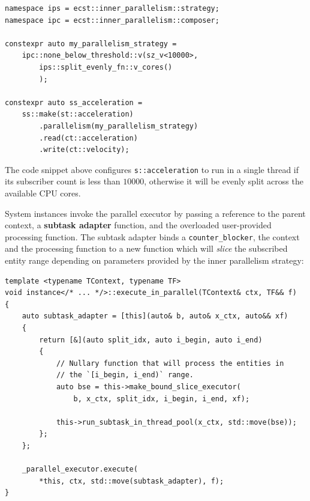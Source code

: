 \documentclass[twoside, 12pt, a4paper, openany]{book}
\begin{document}
\begin{verbatim}
namespace ips = ecst::inner_parallelism::strategy;
namespace ipc = ecst::inner_parallelism::composer;

constexpr auto my_parallelism_strategy =
    ipc::none_below_threshold::v(sz_v<10000>,
        ips::split_evenly_fn::v_cores()
        );

constexpr auto ss_acceleration =
    ss::make(st::acceleration)
        .parallelism(my_parallelism_strategy)
        .read(ct::acceleration)
        .write(ct::velocity);
\end{verbatim}

The code snippet above configures
\texttt{s::acceleration}
to run in a single thread if its subscriber count is less than
\(10000\), otherwise it will be evenly split across the available CPU
cores.

System instances invoke the parallel executor by passing a reference to
the parent context, a \textbf{subtask adapter} function, and the
overloaded user-provided processing function. The subtask adapter binds
a
\texttt{counter_blocker},
the context and the processing function to a new function which will
\emph{slice} the subscribed entity range depending on parameters
provided by the inner parallelism strategy:

\begin{verbatim}
template <typename TContext, typename TF>
void instance</* ... */>::execute_in_parallel(TContext& ctx, TF&& f)
{
    auto subtask_adapter = [this](auto& b, auto& x_ctx, auto&& xf)
    {
        return [&](auto split_idx, auto i_begin, auto i_end)
        {
            // Nullary function that will process the entities in
            // the `[i_begin, i_end)` range.
            auto bse = this->make_bound_slice_executor(
                b, x_ctx, split_idx, i_begin, i_end, xf);

            this->run_subtask_in_thread_pool(x_ctx, std::move(bse));
        };
    };

    _parallel_executor.execute(
        *this, ctx, std::move(subtask_adapter), f);
}
\end{verbatim}
\end{document}
